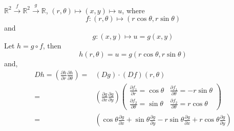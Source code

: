 \documentclass[12pt]{book}
\theoremstyle{definition}
\theoremstyle{remark}
\begin{document}
      \begin{example}
        $\mathbb{R}^2 \overset{f}{\rightarrow} \mathbb{R}^2 \overset{g}{\rightarrow} \mathbb{R}$, $(r, \theta) \mapsto (x,y) \mapsto u$, where 
        $$ f: (r, \theta) \mapsto (r\cos \theta, r \sin \theta) $$
        and 
        $$g : (x,y) \mapsto u = g(x,y) $$
        Let $h = g \circ f$, then 
        $$h(r, \theta) = u = g(r\cos \theta, r \sin \theta) $$
        and, 
        \begin{equation*}
          \begin{split}
            Dh = \left( \frac{\partial h}{\partial r} \frac{\partial h}{\partial \theta}  \right) =& (Dg)\cdot (Df)(r, \theta) \\
            =&  \left( \frac{\partial g}{\partial x} \frac{\partial g}{\partial y}  \right) \begin{pmatrix} \frac{\partial f_1}{\partial r} = \cos \theta & \frac{\partial f_1 }{\partial \theta} = -r \sin \theta \\ 
            \frac{\partial f_2 }{\partial \theta} = \sin \theta & \frac{\partial f_2 }{\partial \theta}=r \cos \theta \end{pmatrix} \\ 
            =& \left( \cos \theta \frac{\partial g }{\partial x} + \sin \theta \frac{\partial g }{\partial y} - r \sin \theta  \frac{\partial g }{\partial x} + r \cos \theta \frac{\partial g }{\partial y}\right)
          \end{split}
        \end{equation*}
      \end{example}
\end{document}
